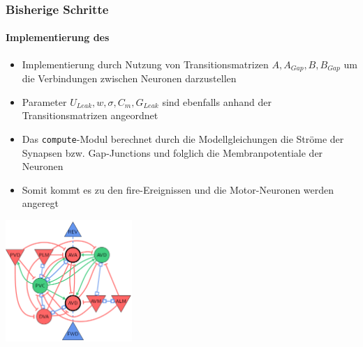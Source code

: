 \documentclass[10pt,t,aspectratio=1610]{beamer}
\newcommand{\code}[1]{\colorbox{light-gray}{\texttt{#1}}}
\begin{document}


\begin{frame}
  \frametitle{Bisherige Schritte}
  \framesubtitle{Implementierung des }
  
  \begin{itemize}
  	\item Implementierung durch Nutzung von Transitionsmatrizen $A, A_{Gap}, B, B_{Gap}$ um die Verbindungen zwischen Neuronen darzustellen
  	\item Parameter $U_{Leak}, w, \sigma, C_m, G_{Leak}$ sind ebenfalls anhand der Transitionsmatrizen angeordnet
  	\item Das \code{compute}-Modul berechnet durch die Modellgleichungen die Ströme der Synapsen bzw. Gap-Junctions und folglich die Membranpotentiale der Neuronen
  	\item Somit kommt es zu den fire-Ereignissen und die Motor-Neuronen werden angeregt
  \end{itemize}

  \begin{center}
  	\centering
  	\includegraphics[width=4.8cm]{figures/nn_lechner.png}
  	\scalebox{0.23}{}
  \end{center}
  
\end{frame}

\end{document}
